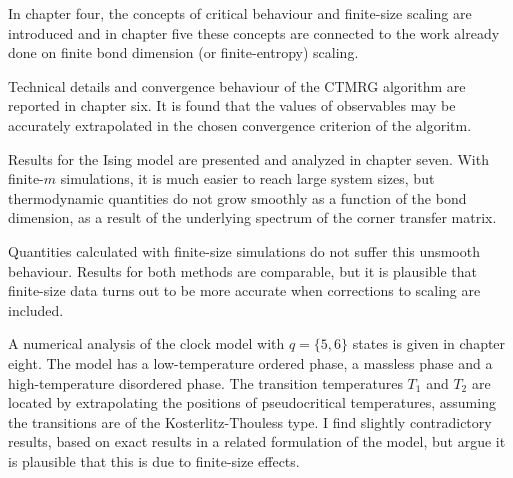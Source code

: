 In chapter four, the concepts of critical behaviour and finite-size
scaling are introduced and in chapter five these concepts are connected to
the work already done on finite bond dimension (or finite-entropy)
scaling.

Technical details and convergence behaviour of the CTMRG algorithm are reported in chapter six.
It is found that the values of observables may be accurately extrapolated in the chosen convergence criterion of the
algoritm.

Results for the Ising model are presented and analyzed in chapter seven.
With finite-$m$ simulations, it is much easier to reach large system sizes,
but thermodynamic quantities do not grow smoothly as a function of the bond dimension,
as a result of the underlying spectrum of the corner transfer matrix.

Quantities calculated with finite-size simulations do not suffer this unsmooth behaviour.
Results for both methods are comparable, but it is plausible that finite-size data turns out to be more accurate when
corrections to scaling are included.

A numerical analysis of the clock model with $q = \{5, 6\}$ states is given in chapter eight.
The model has a low-temperature ordered phase, a massless phase and a high-temperature disordered phase.
The transition temperatures $T_1$ and $T_2$ are located by extrapolating the positions of pseudocritical temperatures,
assuming the transitions are of the Kosterlitz-Thouless type.
I find slightly contradictory results, based on exact results in a related formulation of the model,
but argue it is plausible that this is due to finite-size effects.


